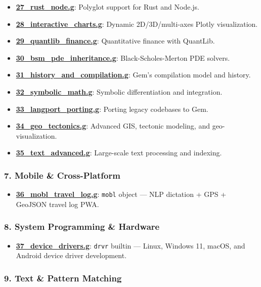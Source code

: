 \documentclass[
]{article}
\providecommand{\tightlist}{%
  \setlength{\itemsep}{0pt}\setlength{\parskip}{0pt}}
\begin{document}
\begin{itemize}
\tightlist
\item
  \textbf{\url{27_rust_node.g}}: Polyglot support for Rust and Node.js.
\item
  \textbf{\url{28_interactive_charts.g}}: Dynamic 2D/3D/multi-axes
  Plotly visualization.
\item
  \textbf{\url{29_quantlib_finance.g}}: Quantitative finance with
  QuantLib.
\item
  \textbf{\url{30_bsm_pde_inheritance.g}}: Black-Scholes-Merton PDE
  solvers.
\item
  \textbf{\url{31_history_and_compilation.g}}: Gem's compilation model
  and history.
\item
  \textbf{\url{32_symbolic_math.g}}: Symbolic differentiation and
  integration.
\item
  \textbf{\url{33_langport_porting.g}}: Porting legacy codebases to Gem.
\item
  \textbf{\url{34_geo_tectonics.g}}: Advanced GIS, tectonic modeling,
  and geo-visualization.
\item
  \textbf{\url{35_text_advanced.g}}: Large-scale text processing and
  indexing.
\end{itemize}

\subsubsection{7. Mobile \& Cross-Platform}\label{mobile-cross-platform}

\begin{itemize}
\tightlist
\item
  \textbf{\url{36_mobl_travel_log.g}}: \texttt{mobl} object --- NLP
  dictation + GPS + GeoJSON travel log PWA.
\end{itemize}

\subsubsection{8. System Programming \&
Hardware}\label{system-programming-hardware}

\begin{itemize}
\tightlist
\item
  \textbf{\url{37_device_drivers.g}}: \texttt{drvr} builtin --- Linux,
  Windows 11, macOS, and Android device driver development.
\end{itemize}

\subsubsection{9. Text \& Pattern Matching}\label{text-pattern-matching}
\end{document}
